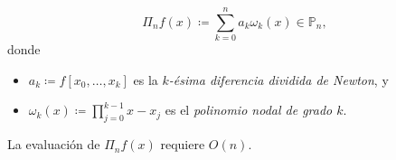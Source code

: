 \begin{frame}



	\begin{definition}
		\begin{equation*}
			\Pi_{n}
			f\left(x\right)\coloneqq
			\sum\limits_{k=0}^{n}
			a_{k}
			\omega_{k}\left(x\right)\in\mathbb{P}_{n},
		\end{equation*}
		donde
		\begin{itemize}
			\item

			      \begin{math}
				      a_{k}\coloneqq
				      f\left[x_{0},\ldots,x_{k}\right]
			      \end{math}
			      es la \emph{$k$-ésima diferencia dividida de Newton}, y

			\item

			      \begin{math}
				      \omega_{k}
				      \left(x\right)\coloneqq
				      \prod\limits_{j=0}^{k-1}
				      x-x_{j}
			      \end{math}
			      es el \emph{polinomio nodal de grado $k$}.
		\end{itemize}
		La evaluación de $\Pi_{n}f\left(x\right)$ requiere
		$O\left(n\right)$.
	\end{definition}
\end{frame}

